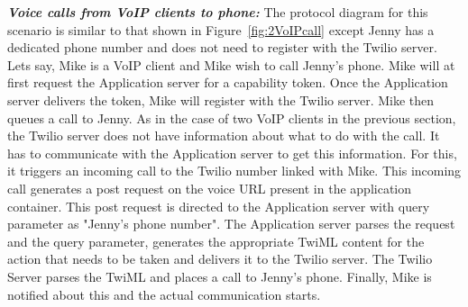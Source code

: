 \emph{\textbf{Voice calls from VoIP clients to phone:} }
The protocol diagram for this scenario is similar to that shown in Figure~\ref{fig:2VoIPcall} except Jenny has a dedicated phone number and does not need to register with the Twilio server. Lets say, Mike is a VoIP client and Mike wish to call Jenny's phone. Mike will at first request the Application server for a capability token. Once the Application server delivers the token, Mike will register with the Twilio server. Mike then queues a call to Jenny. As in the case of two VoIP clients in the previous section, the Twilio server does not have information about what to do with the call. It has to communicate with the Application server to get this information. For this, it triggers an incoming call to the Twilio number linked with Mike. This incoming call generates a post request on the voice URL present in the application container. This post request is directed to the Application server with query parameter as "Jenny's phone number". The Application server parses the request and the query parameter, generates the appropriate TwiML content for the action that needs to be taken and delivers it to the Twilio server. The Twilio Server parses the TwiML and places a call to Jenny's phone. Finally, Mike is notified about this and the actual communication starts.
 
